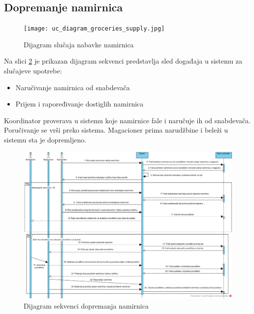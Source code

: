 \subsection{Dopremanje namirnica}
\begin{figure}[H]
\begin{center}
\texttt{[image: uc\_diagram\_groceries\_supply.jpg]}

    \caption{Dijagram slučaja nabavke namirnica}
    \end{center}
\label{fig:Uc_diagram_groceries_supply}
\end{figure}

Na slici \ref{fig:seqGroceryDelivery} je prikazan dijagram sekvenci predstavlja sled događaja u sistemu za slučajeve upotrebe: 
\begin{itemize}
	\item{Naručivanje namirnica od snabdevača}
	\item{Prijem i rapoređivanje dostiglih namirnica}
\end{itemize}

Koordinator proverava u sistemu koje namirnice fale i naručuje ih od snabdevača.
Poručivanje se vrši preko sistema. Magacioner prima narudžbine i beleži u sistemu sta je dopremljeno.


\begin{figure}[H]
	\begin{center}
		\includegraphics[width=\textwidth]{Pictures/seq_diagram_groceries_supply.jpg}
	\end{center}
    \caption{Dijagram sekvenci dopremanja namirnica}
\label{fig:seqGroceryDelivery}
\end{figure}





